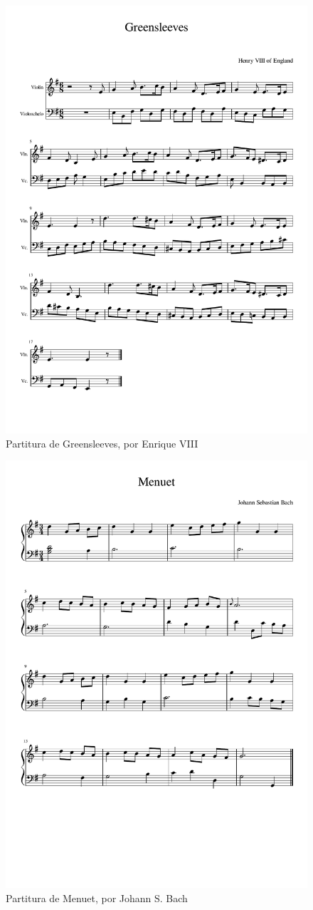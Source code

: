  \begin{figure}
 	\centering
 	\includegraphics[width=0.8\linewidth]{imagenes/scores/Greensleeves.pdf}
 	\caption{Partitura de Greensleeves, por Enrique VIII}
 	\label{fig:greensleeves_score}
 \end{figure}
 
  \begin{figure}
  	\centering
  	\includegraphics[width=0.8\linewidth]{imagenes/scores/menuet_bach.pdf}
  	\caption{Partitura de Menuet, por Johann S. Bach}
  	\label{fig:menuet_score}
  \end{figure}
  
